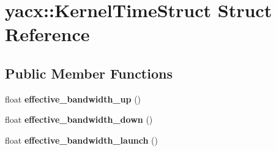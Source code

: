 \hypertarget{structyacx_1_1_kernel_time_struct}{}\section{yacx\+:\+:Kernel\+Time\+Struct Struct Reference}
\label{structyacx_1_1_kernel_time_struct}
\subsection*{Public Member Functions}
\begin{DoxyCompactItemize}
\item 
\mbox{\label{structyacx_1_1_kernel_time_struct_acdb42af03a3c9859563a69b7bb4a62a6}} 
float {\bfseries effective\+\_\+bandwidth\+\_\+up} ()
\item 
\mbox{\label{structyacx_1_1_kernel_time_struct_ab6f0280dba6045874d86f697f4235cc7}} 
float {\bfseries effective\+\_\+bandwidth\+\_\+down} ()
\item 
\mbox{\label{structyacx_1_1_kernel_time_struct_ab73a6a24b874988c34210c826555b465}} 
float {\bfseries effective\+\_\+bandwidth\+\_\+launch} ()
\end{DoxyCompactItemize}
